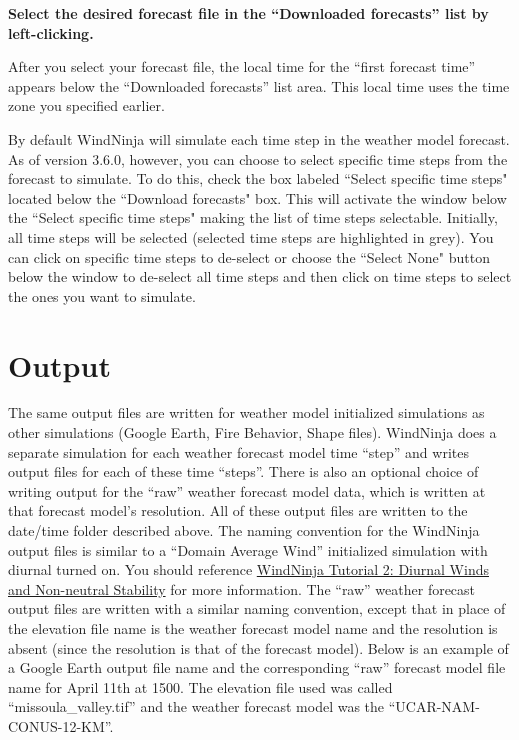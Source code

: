 \documentclass[12pt]{article}
\begin{document}
\textbf{\color{red}Select the desired forecast file in the “Downloaded forecasts” list by left-clicking.}

After you select your forecast file, the local time for the “first forecast time” appears below the “Downloaded forecasts” list area.  This local time uses the time zone you specified earlier.

By default WindNinja will simulate each time step in the weather model forecast. As of version 3.6.0, however, you can choose to select specific time steps from the forecast to simulate. To do this, check the box labeled “Select specific time steps" located below the “Download forecasts" box. This will activate the window below the “Select specific time steps" making the list of time steps selectable. Initially, all time steps will be selected (selected time steps are highlighted in grey). You can click on specific time steps to de-select or choose the “Select None" button below the window to de-select all time steps and then click on time steps to select the ones you want to simulate.

\section{Output}
The same output files are written for weather model initialized simulations as other simulations (Google Earth, Fire Behavior, Shape files).  WindNinja does a separate simulation for each weather forecast model time “step” and writes output files for each of these time “steps”.  There is also an optional choice of writing output for the “raw” weather forecast model data, which is written at that forecast model's resolution.  All of these output files are written to the date/time folder described above.  The naming convention for the WindNinja output files is similar to a “Domain Average Wind” initialized simulation with diurnal turned on.  You should reference \href{https://weather.firelab.org/windninja/tutorials/WindNinja_tutorial2.pdf}{WindNinja Tutorial 2: Diurnal Winds and Non-neutral Stability} for more information.  The “raw” weather forecast output files are written with a similar naming convention, except that in place of the elevation file name is the weather forecast model name and the resolution is absent (since the resolution is that of the forecast model).  Below is an example of a Google Earth output file name and the corresponding “raw” forecast model file name for April 11th at 1500.  The elevation file used was called “missoula\_valley.tif” and the weather forecast model was the “UCAR-NAM-CONUS-12-KM”.
\end{document}
